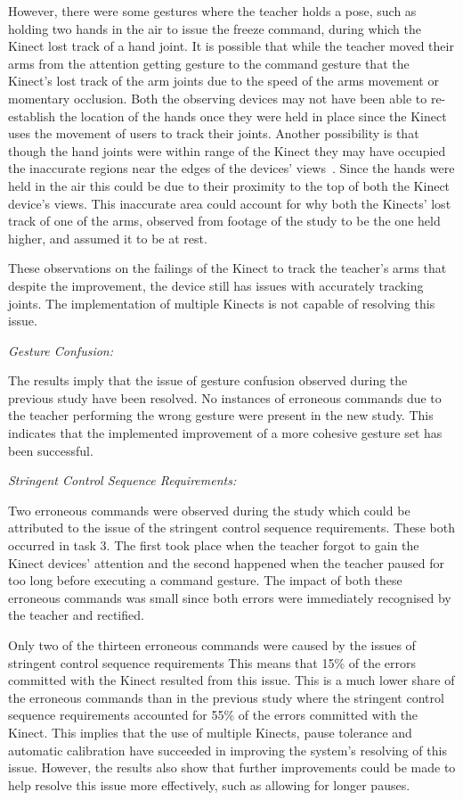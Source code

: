 \documentclass[link]{IWCOMP}
\begin{document}
However, there were some gestures where the teacher holds a pose, such as holding two hands in the air to issue the freeze command, during which the Kinect lost track of a hand joint.
It is possible that while the teacher moved their arms from the attention getting gesture to the command gesture that the Kinect's lost track of the arm joints due to the speed of the arms movement or momentary occlusion.
Both the observing devices may not have been able to re-establish the location of the hands once they were held in place since the Kinect uses the movement of users to track their joints.
Another possibility is that though the hand joints were within range of the Kinect they may have occupied the inaccurate regions near the edges of the devices' views~\cite{Mehrotra2011}.
Since the hands were held in the air this could be due to their proximity to the top of both the Kinect device's views.
This inaccurate area could account for why both the Kinects' lost track of one of the arms, observed from footage of the study to be the one held higher, and assumed it to be at rest.

These observations on the failings of the Kinect to track the teacher's arms that despite the improvement, the device still has issues with accurately tracking joints.
The implementation of multiple Kinects is not capable of resolving this issue.

\emph{Gesture Confusion:}

The results imply that the issue of gesture confusion observed during the previous study have been resolved.
No instances of erroneous commands due to the teacher performing the wrong gesture were present in the new study.
This indicates that the implemented improvement of a more cohesive gesture set has been successful.

\emph{Stringent Control Sequence Requirements:}

Two erroneous commands were observed during the study which could be attributed to the issue of the stringent control sequence requirements.
These both occurred in task 3.
The first took place when the teacher forgot to gain the Kinect devices' attention and the second happened when the teacher paused for too long before executing a command gesture.
The impact of both these erroneous commands was small since both errors were immediately recognised by the teacher and rectified.

Only two of the thirteen erroneous commands were caused by the issues of stringent control sequence requirements
This means that 15\% of the errors committed with the Kinect resulted from this issue.
This is a much lower share of the erroneous commands than in the previous study where the stringent control sequence requirements accounted for 55\% of the errors committed with the Kinect.
This implies that the use of multiple Kinects, pause tolerance and automatic calibration have succeeded in improving the system's resolving of this issue.
However, the results also show that further improvements could be made to help resolve this issue more effectively, such as allowing for longer pauses.
\end{document}
